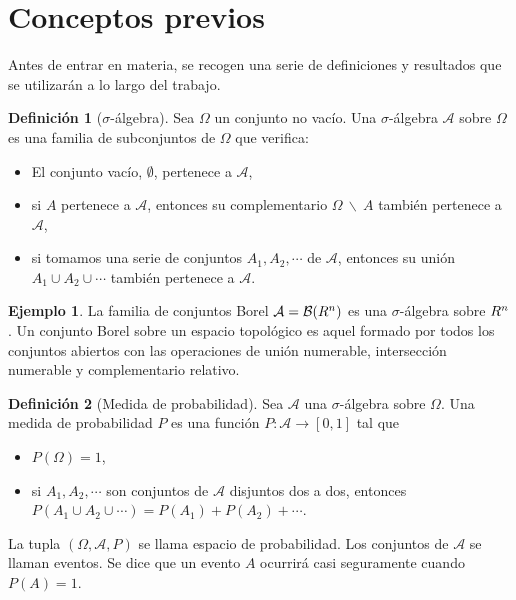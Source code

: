 \documentclass[10pt,a4paper]{article} %
\let\mathbb\relax
\theoremstyle{definition}
\newtheorem{definition}{Definición}[section]
\newtheorem{example}[theorem]{Ejemplo}
\begin{document}
\section{Conceptos previos}

Antes de entrar en materia, se recogen una serie de definiciones y resultados que se utilizarán a lo largo del trabajo.

\begin{definition}[$\sigma$-álgebra]
  Sea $\Omega$ un conjunto no vacío. Una $\sigma$-álgebra $\mathcal{A}$ sobre $\Omega$ es una familia de subconjuntos de $\Omega$ que verifica:
  \begin{itemize}
  \item  El conjunto vacío, $\emptyset$, pertenece a $\mathcal{A}$,
  \item  si $A$ pertenece a $\mathcal{A}$, entonces su complementario $\Omega\ \backslash\ A$ también pertenece a $\mathcal{A}$,
 \item si tomamos una serie de conjuntos $A_1,A_2,\cdots$ de $\mathcal{A}$, entonces su unión $A_1\cup A_2 \cup \cdots$ también pertenece a $\mathcal{A}$.
  \end{itemize}
  
\end{definition}

\begin{example}
La familia de conjuntos Borel $\mathcal{A} = \mathcal{B}(\mathbb{R}^n)$ es una $\sigma$-álgebra sobre $\mathbb{R}^n$. Un conjunto Borel sobre un espacio topológico es aquel formado por todos los conjuntos abiertos con las operaciones de unión numerable, intersección numerable y complementario relativo.
\end{example}

\begin{definition}[Medida de probabilidad]
  Sea $\mathcal{A}$ una $\sigma$-álgebra sobre $\Omega$. Una medida de probabilidad $P$ es una función $P:\mathcal{A} \to [0,1]$ tal que
  \begin{itemize}
  \item $P(\Omega) = 1$,
   \item si $A_1,A_2,\cdots$ son conjuntos de $\mathcal{A}$ disjuntos dos a dos, entonces $P(A_1\cup A_2 \cup \cdots) = P(A_1)+P(A_2)+\cdots$. 
  \end{itemize}
\end{definition}

La tupla $(\Omega, \mathcal{A}, P)$ se llama espacio de probabilidad. Los conjuntos de $\mathcal{A}$ se llaman eventos. Se dice que un evento $A$ ocurrirá casi seguramente cuando $P(A)=1$.\\
\end{document}
